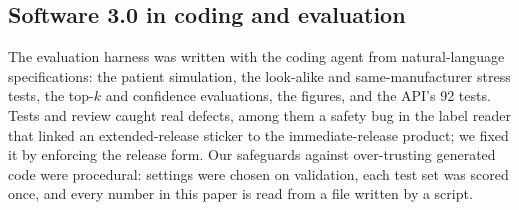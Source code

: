 \subsection{Software 3.0 in coding and evaluation}
\label{sec:sw3-experiments}

The evaluation harness was written with the coding agent from natural-language specifications: the patient
simulation, the look-alike and same-manufacturer stress tests, the top-$k$ and confidence evaluations, the figures, and
the API's 92 tests. Tests and review caught real defects, among them a safety bug in the label reader that linked an
extended-release sticker to the immediate-release product; we fixed it by enforcing the release form. Our safeguards
against over-trusting generated code were procedural: settings were chosen on validation, each test set was scored
once, and every number in this paper is read from a file written by a script.
